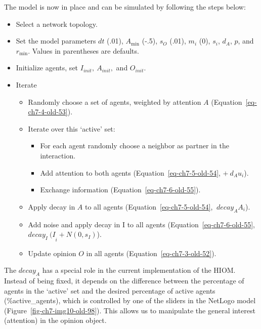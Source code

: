 \documentclass[
  a4paper,
  DIV=11,
  numbers=noendperiod,
  oneside]{scrreprt}
\begin{document}
The model is now in place and can be simulated by following the steps
below:

\begin{itemize}
\item
  Select a network topology.
\item
  Set the model parameters \(dt\) (.01), \(A_{\min}\) (-.5), \(s_{O}\)
  (.01), \(m_{i}\) (0), \(s_{i}\), \(d_{A}\), \(p\), and \(r_{\min}\).
  Values in parentheses are defaults.
\item
  Initialize agents, set \(I_{init},\ A_{init},\) and \(O_{init}\).
\item
  Iterate

  \begin{itemize}
  \item
    Randomly choose a set of agents, weighted by attention \(A\)
    (Equation~\ref{eq-ch7-4-old-53}).
  \item
    Iterate over this `active' set:

    \begin{itemize}
    \item
      For each agent randomly choose a neighbor as partner in the
      interaction.
    \item
      Add attention to both agents (Equation~\ref{eq-ch7-5-old-54},
      \(+ \ d_{A}u_{i}\)).
    \item
      Exchange information (Equation~\ref{eq-ch7-6-old-55}).
    \end{itemize}
  \item
    Apply decay in \(A\) to all agents (Equation~\ref{eq-ch7-5-old-54},
    \({\ decay}_{A}A_{i}\)).
  \item
    Add noise and apply decay in I to all agents
    (Equation~\ref{eq-ch7-6-old-55},
    \({decay_{I}\ (I}_{i} + Ν(0,s_{I})\)).
  \item
    Update opinion \(O\) in all agents (Equation~\ref{eq-ch7-3-old-52}).
  \end{itemize}
\end{itemize}

The \({decay}_{A}\) has a special role in the current implementation of
the HIOM. Instead of being fixed, it depends on the difference between
the percentage of agents in the `active' set and the desired percentage
of active agents (\%active\_agents), which is controlled by one of the
sliders in the NetLogo model (Figure~\ref{fig-ch7-img10-old-98}). This
allows us to manipulate the general interest (attention) in the opinion
object.
\end{document}
